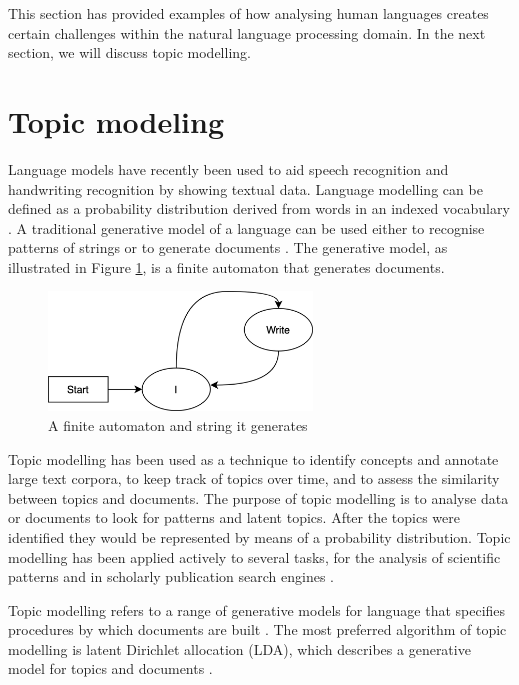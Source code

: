 This section has provided examples of how analysing human languages creates certain challenges within the natural language processing domain.
In the next section, we will discuss topic modelling.

\section{Topic modeling} \label{ssec:tmodel}

Language models have recently been used to aid speech recognition and handwriting recognition by showing textual data. Language modelling can be defined as a probability distribution derived from words in an indexed vocabulary \cite{croft2010search}. 
A traditional generative model of a language can be used either to recognise patterns of strings or to generate documents \cite{Sajjadi2018AssessingGM}. 
The generative model, as illustrated in Figure \ref{fig:automon}, is a finite automaton that generates documents. 

\begin{figure}[htbp]
\centering
\includegraphics[width=7cm]{./figures/automon8.png}
\caption{A finite automaton and string it generates}
\label{fig:automon}
\end{figure}

Topic modelling has been used as a technique to identify concepts and annotate large text corpora, to keep track of topics over time, and to assess the similarity between topics and documents. The purpose of topic modelling is to analyse data or documents to look for patterns and latent topics. After the topics were identified they would be represented by means of a probability distribution. Topic modelling has been applied actively to several tasks, for the analysis of scientific patterns \cite{lau2012line,yi2009comparative,wei2006lda,yi2009comparative} and in scholarly publication search engines \cite{newman2010evaluating}.

Topic modelling refers to a range of generative models for language that specifies procedures by which documents are built \cite{blei2003latent}. The most preferred algorithm of topic modelling is latent Dirichlet allocation (LDA), which describes a generative model for topics and documents \cite{blei2003latent}.

